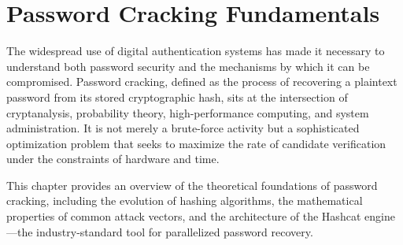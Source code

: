 




\chapter{Password Cracking Fundamentals}

The widespread use of digital authentication systems has made it necessary to understand both password security and the mechanisms by which it can be compromised. Password cracking, defined as the process of recovering a plaintext password from its stored cryptographic hash, sits at the intersection of cryptanalysis, probability theory, high-performance computing, and system administration. It is not merely a brute-force activity but a sophisticated optimization problem that seeks to maximize the rate of candidate verification under the constraints of hardware and time.

This chapter provides an overview of the theoretical foundations of password cracking, including the evolution of hashing algorithms, the mathematical properties of common attack vectors, and the architecture of the Hashcat engine—the industry-standard tool for parallelized password recovery.


